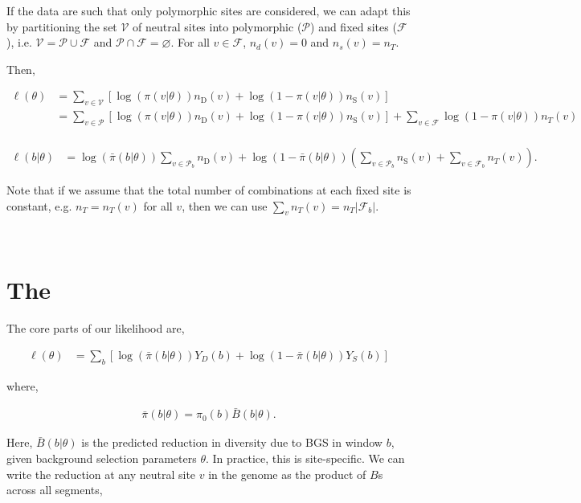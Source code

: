 \documentclass[11pt]{article}
\begin{document}
If the data are such that only polymorphic sites are considered, we can adapt
this by partitioning the set $\mathcal{V}$ of neutral sites into polymorphic
($\mathcal{P}$) and fixed sites ($\mathcal{F}$), i.e. $\mathcal{V} =
\mathcal{P} \cup \mathcal{F}$ and $\mathcal{P} \cap \mathcal{F} = \varnothing$.
For all $v \in \mathcal{F}$, $n_d(v) = 0$ and $n_s(v) = n_T$.

Then, 

\begin{align}
  \ell(\theta) &= \sum_{v \in \mathcal{V}} \left[\log(\pi(v | \theta)) n_\text{D}(v) + \log(1-\pi(v | \theta)) n_\text{S}(v)\right] \\
                  &= \sum_{v \in \mathcal{P}} \left[\log(\pi(v | \theta)) n_\text{D}(v) + \log(1-\pi(v | \theta)) n_\text{S}(v)\right] + \sum_{v \in \mathcal{F}} \log(1-\pi(v | \theta)) n_T(v)  \\
\end{align}

\begin{align}
  \ell(b | \theta)  &= \log(\bar{\pi}(b | \theta)) \sum_{v \in \mathcal{P}_b} n_\text{D}(v) + \log(1-\bar{\pi}(b | \theta)) \left(\sum_{v \in \mathcal{P}_b} n_\text{S}(v) +  \sum_{v \in \mathcal{F}_b} n_T(v)  \right).
\end{align}

Note that if we assume that the total number of combinations at each fixed site
is constant, e.g. $n_T = n_T(v)$ for all $v$, then we can use $\sum_v n_T(v) =
n_T |\mathcal{F}_b|$.

\
\section*{The }

The core parts of our likelihood are,

\begin{align}
  \ell(\theta) &=  \sum_b [\log(\bar{\pi}(b | \theta)) Y_D(b) + \log(1-\bar{\pi}(b | \theta)) Y_S(b)]
\end{align}

where,

\begin{align}
  \bar{\pi}(b |\theta) = \pi_0(b) \bar{B}(b | \theta).
\end{align}

Here, $\bar{B}(b | \theta)$ is the predicted reduction in diversity due to BGS
in window $b$, given background selection parameters $\theta$. In practice,
this is site-specific. We can write the reduction at any neutral site $v$ in
the genome as the product of $B$s across all segments, 
\end{document}

